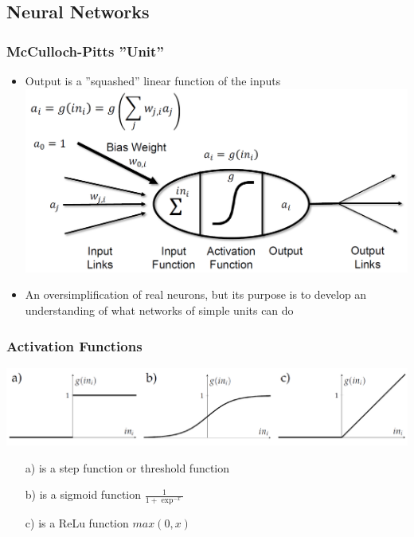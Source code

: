 \documentclass[conference]{styles/acmsiggraph}
\begin{document}
    \subsection{Neural Networks}
        \subsubsection{McCulloch-Pitts ''Unit''}
            \begin{itemize}
                \item Output is a ''squashed'' linear function of the inputs\newline
                \includegraphics[width=1\textwidth]{imgs/McCulloch.png}
                \item An oversimplification of real neurons, but its purpose is to develop an understanding of what networks of simple units can do
            \end{itemize}
        
        \subsubsection{Activation Functions}
            \includegraphics[width=1\textwidth]{imgs/ActivationFunctions.png}
            \begin{itemize}
                \item[a)] is a step function or threshold function
                \item[b)] is a sigmoid function $\frac{1}{1 + \exp^{-x}}$
                \item[c)] is a ReLu function $max(0,x)$
            \end{itemize}
        
\end{document}
